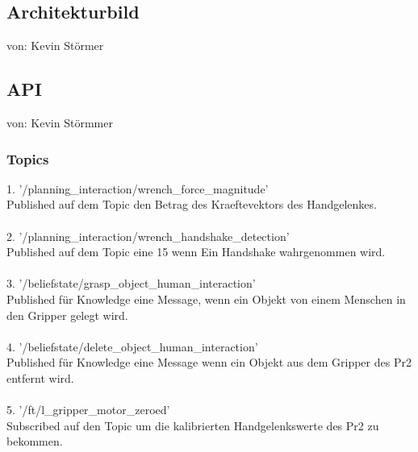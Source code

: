 \documentclass{suturo}
\makeatletter
\newcommand{\chapterauthor}[1]{%
  {\parindent0pt\vspace*{-27pt}%
  \linespread{0}\small\begin{flushright}von: #1\end{flushright}%
  \par\nobreak\vspace*{0pt}}
  \@afterheading%
}
\makeatother
\begin{document}
\subsection{Architekturbild}
\chapterauthor{Kevin Störmer}



\begin{figure}[!htb]
\end{figure}



\subsection{API}
\chapterauthor{Kevin Störmmer}
\subsubsection{Topics}
1. '/planning\_interaction/wrench\_force\_magnitude' \\
Published auf dem Topic den Betrag des Kraeftevektors des Handgelenkes.\\ \\
2. '/planning\_interaction/wrench\_handshake\_detection' \\
Published auf dem Topic eine 15 wenn Ein Handshake wahrgenommen wird.\\ \\
3. '/beliefstate/grasp\_object\_human\_interaction' \\
Published für Knowledge eine Message, wenn ein Objekt von einem Menschen in den Gripper gelegt wird.\\ \\
4. '/beliefstate/delete\_object\_human\_interaction' \\
Published für Knowledge eine Message wenn ein Objekt aus dem Gripper des Pr2 entfernt wird.\\ \\
5. '/ft/l\_gripper\_motor\_zeroed' \\
Subscribed auf den Topic um die kalibrierten Handgelenkswerte des Pr2 zu bekommen.\\ \\
\end{document}

